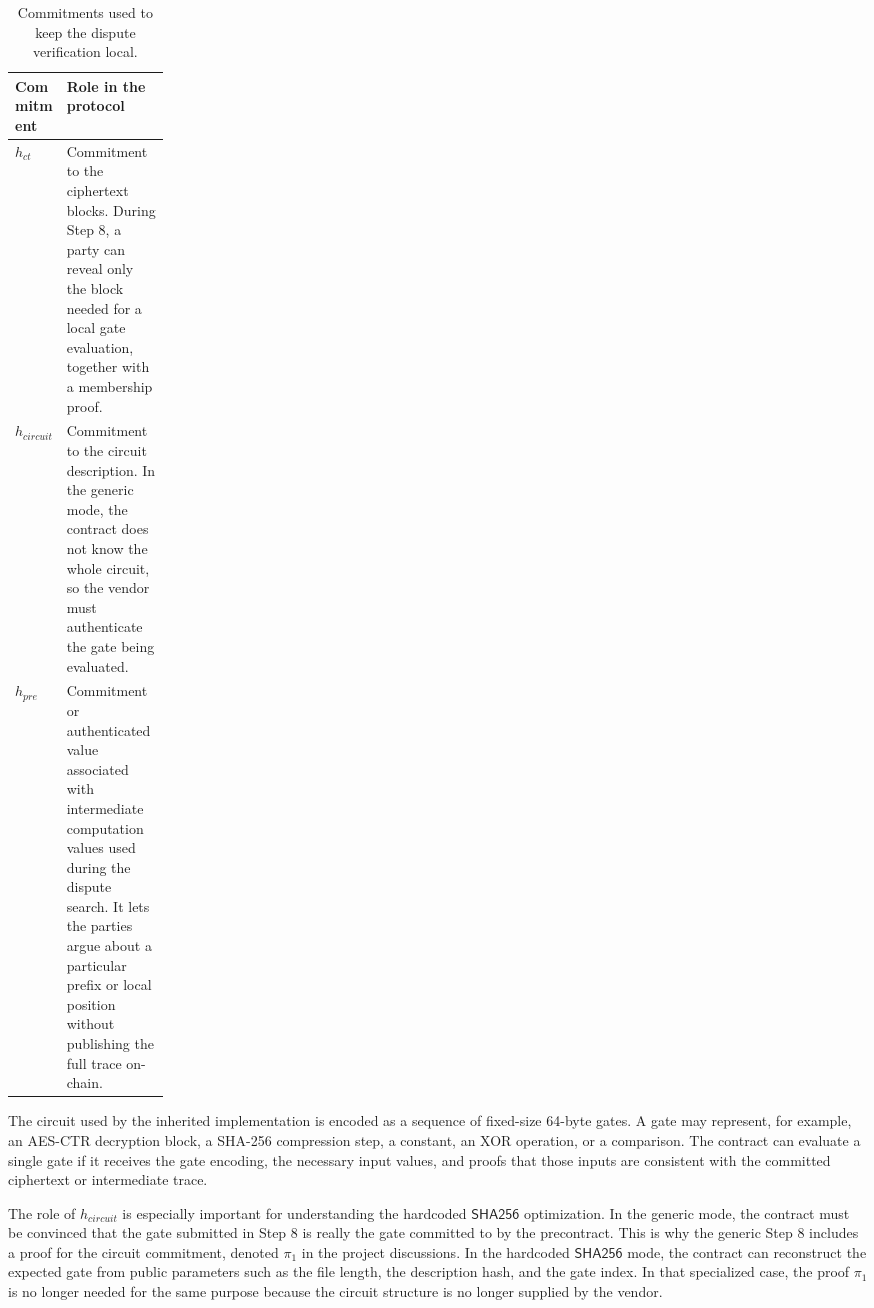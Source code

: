 \begin{table}[htbp]
  \centering
  \begin{tabularx}{\linewidth}{>{\raggedright\arraybackslash}p{0.18\linewidth}>{\raggedright\arraybackslash}X}
    \toprule
    Commitment & Role in the protocol \\
    \midrule
    \(h_{ct}\) &
    Commitment to the ciphertext blocks. During Step 8, a party can reveal only the block
    needed for a local gate evaluation, together with a membership proof. \\
    \(h_{circuit}\) &
    Commitment to the circuit description. In the generic mode, the contract does not know
    the whole circuit, so the vendor must authenticate the gate being evaluated. \\
    \(h_{pre}\) &
    Commitment or authenticated value associated with intermediate computation values used
    during the dispute search. It lets the parties argue about a particular prefix or local
    position without publishing the full trace on-chain. \\
    \bottomrule
  \end{tabularx}
  \caption{Commitments used to keep the dispute verification local.}
  \label{tab:background-commitments}
\end{table}

The circuit used by the inherited implementation is encoded as a sequence of fixed-size
64-byte gates. A gate may represent, for example, an AES-CTR decryption block, a SHA-256
compression step, a constant, an XOR operation, or a comparison. The contract can evaluate a
single gate if it receives the gate encoding, the necessary input values, and proofs that
those inputs are consistent with the committed ciphertext or intermediate trace.

The role of \(h_{circuit}\) is especially important for understanding the hardcoded
\(\mathsf{SHA256}\) optimization. In the generic mode, the contract must be convinced that
the gate submitted in Step 8 is really the gate committed to by the precontract. This is why
the generic Step 8 includes a proof for the circuit commitment, denoted \(\pi_1\) in the
project discussions. In the hardcoded \(\mathsf{SHA256}\) mode, the contract can reconstruct
the expected gate from public parameters such as the file length, the description hash, and
the gate index. In that specialized case, the proof \(\pi_1\) is no longer needed for the
same purpose because the circuit structure is no longer supplied by the vendor.

